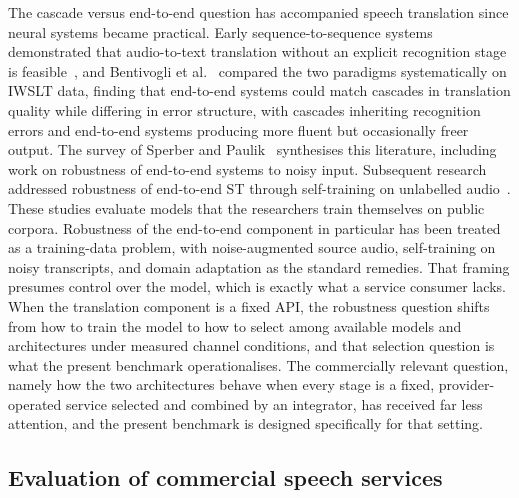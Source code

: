 The cascade versus end-to-end question has accompanied speech translation
since neural systems became practical. Early sequence-to-sequence systems
demonstrated that audio-to-text translation without an explicit recognition
stage is feasible~\cite{berard2016listen,weiss2017sequence}, and
Bentivogli et al.~\cite{bentivogli2021cascade} compared the two paradigms
systematically on IWSLT data, finding that end-to-end systems could match
cascades in translation quality while differing in error structure, with
cascades inheriting recognition errors and end-to-end systems producing more
fluent but occasionally freer output. The survey of Sperber and
Paulik~\cite{sperber2020speech} synthesises this literature, including work on
robustness of end-to-end systems to noisy input. Subsequent research
addressed robustness of end-to-end ST through self-training on
unlabelled audio~\cite{pino2020self}. These studies evaluate models that the
researchers train themselves on public corpora. Robustness of the end-to-end component in
particular has been treated as a training-data problem, with noise-augmented
source audio, self-training on noisy transcripts, and domain adaptation as
the standard remedies. That framing presumes control over the model, which
is exactly what a service consumer lacks. When the translation component is
a fixed API, the robustness question shifts from how to train the model to
how to select among available models and architectures under measured
channel conditions, and that selection question is what the present
benchmark operationalises. The commercially relevant
question, namely how the two architectures behave when every stage is a
fixed, provider-operated service selected and combined by an integrator, has
received far less attention, and the present benchmark is designed
specifically for that setting.

\subsection{Evaluation of commercial speech services}

